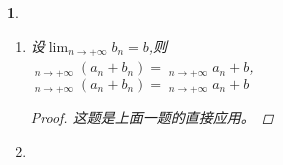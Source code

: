 \documentclass[utf8]{book}
\newtheorem{example}{}[section]             %
\DeclareMathOperator*\lowlim{\underline{lim}}
\DeclareMathOperator*\uplim{\overline{lim}}
\begin{document}
\begin{example}
\begin{enumerate}
\begin{proof}
取子列$\{a_{n_k}\}$,使得
$$\displaystyle\lim_{k\to +\infty}a_{n_k}=\displaystyle\lowlim_{n\to +\infty}a_n.$$
考虑子列$\{a_{n_k}+b_{n_k}\}$，在其中取子列$\{a_{n_{k_l}} + b_{n_{k_l}}\}$,使得
$$\displaystyle\lim_{l\to +\infty}(a_{n_{k_l}}+b_{n_{k_l}}) = \displaystyle\lowlim_{k\to +\infty}(a_{n_k} + b_{n_k}) \geq \displaystyle\lowlim_{n\to +\infty}(a_n + b_n).$$
对于同样下标的子列$\{b_{n_{k_l}}\}$, 我们有
$$\displaystyle\lim_{l\to +\infty}b_{n_{k_l}} \leq \displaystyle\uplim_{k\to +\infty}b_{n_k}\leq \displaystyle\uplim_{n\to +\infty}b_n.$$

由此可见
\begin{equation*}
\begin{split}
\displaystyle\lowlim_{n\to +\infty}(a_n + b_n) &\leq \displaystyle\lim_{l\to +\infty}(a_{n_{k_l}}+b_{n_{k_l}}) \\&= \displaystyle\lim_{l\to +\infty}a_{n_{k_l}}+\displaystyle\lim_{l\to +\infty}b_{n_{k_l}}\\&\leq \displaystyle\lim_{k\to +\infty}a_{n_k} + \displaystyle\uplim_{n\to +\infty}b_n\\&=\displaystyle\lowlim_{n\to +\infty}a_n+ \displaystyle\uplim_{n\to +\infty}b_n
\end{split}
\end{equation*}

下面我们用类似的办法证明第二式亦成立。
取子列$\{a_{n_k} + b_{n_k}\}$,使得
$$\displaystyle\lim_{k\to +\infty}(a_{n_k} + b_{n_k}) =  \displaystyle\uplim_{n\to +\infty}(a_n + b_n).$$
取子列$\{b_{n_{k_l}}\}$使得
$$\displaystyle\lim_{l\to +\infty}b_{n_{k_l}} = \displaystyle\uplim_{k\to +\infty}b_{n_k} \geq \displaystyle\uplim_{n\to +\infty}b_n.$$
对于子列$\{a_{n_{k_l}}\}$,我们有
$$\displaystyle\lim_{l\to +\infty}a_{n_{k_l}} \geq \displaystyle\lowlim_{k\to +\infty}a_{n_k} \geq  \displaystyle\lowlim_{n\to +\infty}a_n.$$
于是$$\displaystyle\lowlim_{n\to +\infty}a_n+\displaystyle\uplim_{n\to +\infty}b_n \leq \displaystyle\uplim_{n\to +\infty}(a_n + b_n).$$
另一方面
$$\displaystyle\lim_{l\to +\infty}a_{n_{k_l}}\leq \displaystyle\uplim_{k\to +\infty}a_{n_k} \leq \displaystyle\uplim_{n\to +\infty}a_n.$$
所以
$$\displaystyle\uplim_{n\to +\infty}(a_n + b_n) \leq \displaystyle\uplim_{n\to +\infty}a_n + \displaystyle\uplim_{n\to +\infty}b_n.$$
\end{proof}
\item 设$\displaystyle\lim_{n\to +\infty}b_n = b$,则\\
$\displaystyle\lowlim_{n\to +\infty}(a_n + b_n) = \displaystyle\lowlim_{n\to +\infty}a_n + b$,\\
$\displaystyle\uplim_{n\to +\infty}(a_n + b_n) = \displaystyle\uplim_{n\to +\infty}a_n + b$
\begin{proof}
这题是上面一题的直接应用。
\end{proof}
\item 
\end{enumerate}

\end{example}
\end{document}
